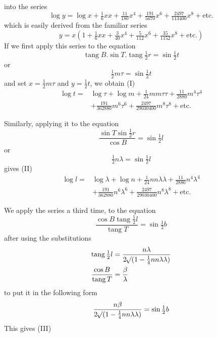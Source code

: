 %
into the series
\[
\log y=\log x+\tfrac16xx+\tfrac{11}{180}x^4+\tfrac{191}{5670}x^6+\tfrac{2497}{113400}x^8+\text{etc.}
\]
which is easily derived from the familiar series
\[
y=x(1+\tfrac16xx+\tfrac3{40}x^4+\tfrac5{112}x^6+\tfrac{35}{1152}x^8+\text{etc.})
\]
If we first apply this series to the equation
\[
\operatorname{tang}B\mathord{.}\sin T\mathord{.}\operatorname{tang}\tfrac12r=\sin\tfrac12t
\]
or
\[
\tfrac12m\tau=\sin\tfrac12t
\]
and set \(x=\frac12m\tau\) and \(y=\frac12t\), we obtain (I)
\[
\begin{aligned}
\log t={}&\log\tau+\log m+\tfrac1{24}mm\tau\tau+\tfrac{11}{2880}m^4\tau^4\\
&+\tfrac{191}{362880}m^6\tau^6+\tfrac{2497}{29030400}m^8\tau^8+\text{etc.}
\end{aligned}
\]

\indent Similarly, applying it to the equation
\[
\frac{\sin T\sin\frac12r}{\cos B}=\sin\tfrac12l
\]
or
\[
\tfrac12n\lambda=\sin\tfrac12l
\]
gives (II)
\[
\begin{aligned}
\log l={}&\log\lambda+\log n+\tfrac1{24}nn\lambda\lambda+\tfrac{11}{2880}n^4\lambda^4\\
&+\tfrac{191}{362880}n^6\lambda^6+\tfrac{2497}{29030400}n^8\lambda^8+\text{etc.}
\end{aligned}
\]

\indent We apply the series a third time, to the equation
\[
\frac{\cos B\operatorname{tang}\frac12l}{\operatorname{tang}T}=\sin\tfrac12b
\]
after using the substitutions
\[
\begin{aligned}
\operatorname{tang}\tfrac12l&=\frac{n\lambda}{2\mathord{{}^{}\!\surd}(1-\frac14nn\lambda\lambda)}\\
\frac{\cos B}{\operatorname{tang}T}&=\frac\beta\lambda
\end{aligned}
\]
to put it in the following form
\[
\frac{n\beta}{2\mathord{{}^{}\!\surd}(1-\frac14nn\lambda\lambda)}=\sin\tfrac12b
\]
This gives (III)
